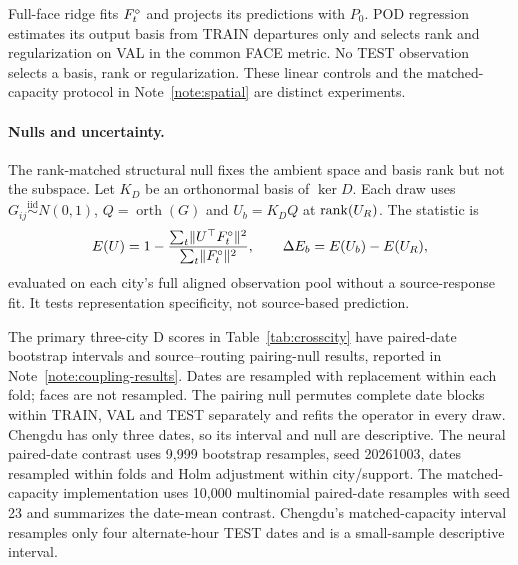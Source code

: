 Full-face ridge fits $F^{\circ}_t$ and projects its predictions with $P_0$. POD regression estimates its output basis from TRAIN departures only and selects rank and regularization on VAL in the common FACE metric. No TEST observation selects a basis, rank or regularization. These linear controls and the matched-capacity protocol in Note~\ref{note:spatial} are distinct experiments.

\paragraph{Nulls and uncertainty.} The rank-matched structural null fixes the ambient space and basis rank but not the subspace. Let $K_D$ be an orthonormal basis of $\ker D$. Each draw uses $G_{ij}\overset{\mathrm{iid}}{\sim}N(0,1)$, $Q=\operatorname{orth}(G)$ and $U_b=K_DQ$ at $\operatorname{rank}(U_{R})$. The statistic is
\begin{equation}
 E(U)=1-\frac{\sum_t\lVert U^\top F^{\circ}_t \rVert^2}{\sum_t\lVert F^{\circ}_t \rVert^2},
 \qquad \Delta E_b=E(U_b)-E(U_{R}),
 \label{eq:supp-rank-null}
\end{equation}
evaluated on each city's full aligned observation pool without a source-response fit. It tests representation specificity, not source-based prediction.

The primary three-city D scores in Table~\ref{tab:crosscity} have paired-date bootstrap intervals and source--routing pairing-null results, reported in Note~\ref{note:coupling-results}. Dates are resampled with replacement within each fold; faces are not resampled. The pairing null permutes complete date blocks within TRAIN, VAL and TEST separately and refits the operator in every draw. Chengdu has only three dates, so its interval and null are descriptive. The neural paired-date contrast uses 9,999 bootstrap resamples, seed 20261003, dates resampled within folds and Holm adjustment within city/support. The matched-capacity implementation uses 10,000 multinomial paired-date resamples with seed 23 and summarizes the date-mean contrast. Chengdu's matched-capacity interval resamples only four alternate-hour TEST dates and is a small-sample descriptive interval.
